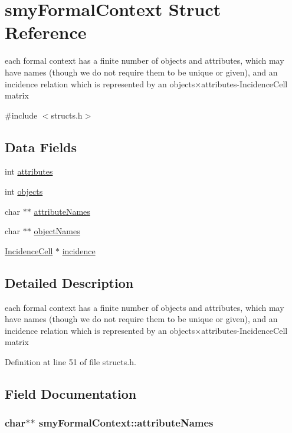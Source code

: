 \hypertarget{structsmyFormalContext}{\section{smy\-Formal\-Context \-Struct \-Reference}
\label{structsmyFormalContext}
}


each formal context has a finite number of objects and attributes, which may have names (though we do not require them to be unique or given), and an incidence relation which is represented by an objects×attributes-\/\-Incidence\-Cell matrix  




{\ttfamily \#include $<$structs.\-h$>$}

\subsection*{\-Data \-Fields}
\begin{DoxyCompactItemize}
\item 
int \hyperlink{structsmyFormalContext_a4ae89e8f42fd7feab4db872cd8472b5e}{attributes}
\item 
int \hyperlink{structsmyFormalContext_ab6e220297887bc2af0e612c94132ceb3}{objects}
\item 
char $\ast$$\ast$ \hyperlink{structsmyFormalContext_a731e638aa85ebc11076f9e17ada14c29}{attribute\-Names}
\item 
char $\ast$$\ast$ \hyperlink{structsmyFormalContext_a732a2615921f2d209fb7d9341df2c183}{object\-Names}
\item 
\hyperlink{fca_8h_a92fa84ef7a12663bb998f141ab729056}{\-Incidence\-Cell} $\ast$ \hyperlink{structsmyFormalContext_a55d9d4c2e38c3571e9f6e870bc1c06b8}{incidence}
\end{DoxyCompactItemize}


\subsection{\-Detailed \-Description}
each formal context has a finite number of objects and attributes, which may have names (though we do not require them to be unique or given), and an incidence relation which is represented by an objects×attributes-\/\-Incidence\-Cell matrix 

\-Definition at line 51 of file structs.\-h.



\subsection{\-Field \-Documentation}
\hypertarget{structsmyFormalContext_a731e638aa85ebc11076f9e17ada14c29}{
\subsubsection[{attribute\-Names}]{\setlength{\rightskip}{0pt plus 5cm}char$\ast$$\ast$ {\bf smy\-Formal\-Context\-::attribute\-Names}}}\label{structsmyFormalContext_a731e638aa85ebc11076f9e17ada14c29}


